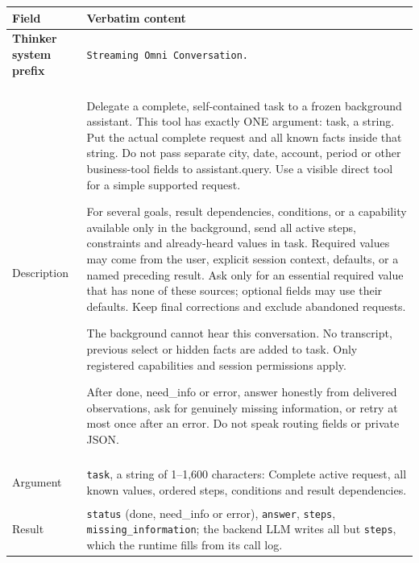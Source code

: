 \begin{table}[tp]
\centering\footnotesize
\setlength{\tabcolsep}{3pt}
\renewcommand{\arraystretch}{1.14}
\newcommand{\duoprapromptsep}{%
  \arrayrulecolor{black!22}%
  \specialrule{0.32pt}{3.5pt}{3.5pt}%
  \arrayrulecolor{black}%
}
\begin{tabular}{@{}
  >{\raggedright\arraybackslash\bfseries}p{}
  @{\hspace{9pt}}
  >{\raggedright\arraybackslash}p{}
@{}}
\toprule
\rowcolor{tablehead} Field & Verbatim content \\
\midrule
\textbf{Thinker system prefix} &
\texttt{Streaming Omni Conversation.} \\
\midrule
\rowcolor{tablealt}\multicolumn{2}{@{}l@{}}{\textbf{Backend tool \tool{assistant.query} in training}} \\
\duoprapromptsep
Description &
Delegate a complete, self-contained task to a frozen background assistant. This tool has exactly ONE argument: task, a string. Put the actual complete request and all known facts inside that string. Do not pass separate city, date, account, period or other business-tool fields to assistant.query. Use a visible direct tool for a simple supported request.\par\smallskip For several goals, result dependencies, conditions, or a capability available only in the background, send all active steps, constraints and already-heard values in task. Required values may come from the user, explicit session context, defaults, or a named preceding result. Ask only for an essential required value that has none of these sources; optional fields may use their defaults. Keep final corrections and exclude abandoned requests.\par\smallskip The background cannot hear this conversation. No transcript, previous select or hidden facts are added to task. Only registered capabilities and session permissions apply.\par\smallskip After done, need\_info or error, answer honestly from delivered observations, ask for genuinely missing information, or retry at most once after an error. Do not speak routing fields or private JSON. \\
\duoprapromptsep
Argument &
\texttt{task}, a string of 1--1,600 characters: Complete active request, all known values, ordered steps, conditions and result dependencies. \\
\duoprapromptsep
Result &
\texttt{status} (\textsf{done}, \textsf{need\_info} or \textsf{error}), \texttt{answer}, \texttt{steps}, \texttt{missing\_information}; the backend LLM writes all but \texttt{steps}, which the runtime fills from its call log. \\

\end{tabular}
\end{table}
